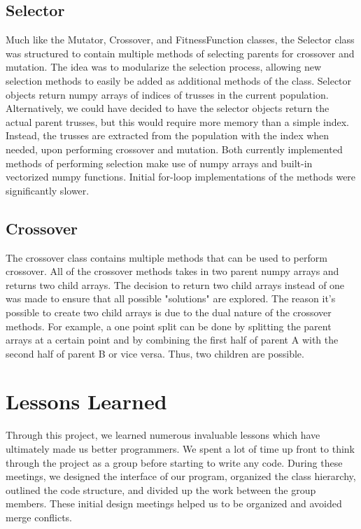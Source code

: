 \documentclass{article}
\begin{document}
\subsection{Selector}
Much like the Mutator, Crossover, and FitnessFunction classes, the Selector class was structured to contain multiple methods of selecting parents for crossover and mutation. The idea was to modularize the selection process, allowing new selection methods to easily be added as additional methods of the class. Selector objects return numpy arrays of indices of trusses in the current population. Alternatively, we could have decided to have the selector objects return the actual parent trusses, but this would require more memory than a simple index. Instead, the trusses are extracted from the population with the index when needed, upon performing crossover and mutation. Both currently implemented methods of performing selection make use of numpy arrays and built-in vectorized numpy functions. Initial for-loop implementations of the methods were significantly slower.

\subsection{Crossover}
The crossover class contains multiple methods that can be used to perform crossover.
All of the crossover methods takes in two parent numpy arrays and returns two child
arrays. The decision to return two child arrays instead of one was made to ensure
that all possible "solutions" are explored. The reason it's possible to create two
child arrays is due to the dual nature of the crossover methods. For example, a one
point split can be done by splitting the parent arrays at a certain point and by
combining the first half of parent A with the second half of parent B or vice versa.
Thus, two children are possible.

\section{Lessons Learned}
Through this project, we learned numerous invaluable lessons which have ultimately
made us better programmers. We spent a lot of time up front to think through the
project as a group before starting to write any code. During these meetings,
we designed the interface of our program, organized the class hierarchy, outlined
the code structure, and divided up the work between the group members. These
initial design meetings helped us to be organized and avoided merge conflicts.
\end{document}
